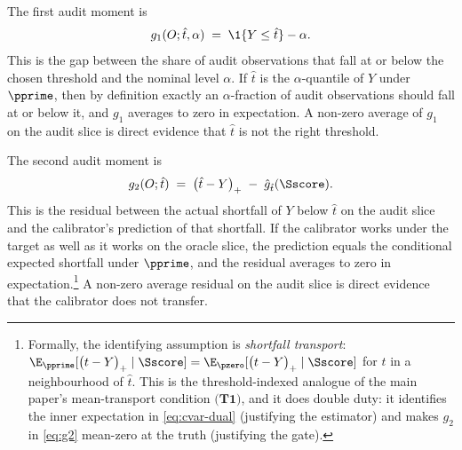 \documentclass[11pt]{article}
\newcommand{\stoploss}[2]{\bigl(#1 - #2\bigr)_{+}}
\begin{document}
The first audit moment is
\begin{equation}\label{eq:g1}
g_1(O; \hat t, \alpha) \;=\; \1\{Y \le \hat t\} - \alpha.
\end{equation}
This is the gap between the share of audit observations that fall at or below the chosen threshold and the nominal level $\alpha$. If $\hat t$ is the $\alpha$-quantile of $Y$ under $\pprime$, then by definition exactly an $\alpha$-fraction of audit observations should fall at or below it, and $g_1$ averages to zero in expectation. A non-zero average of $g_1$ on the audit slice is direct evidence that $\hat t$ is not the right threshold.

The second audit moment is
\begin{equation}\label{eq:g2}
g_2(O; \hat t) \;=\; \stoploss{\hat t}{Y} \;-\; \hat g_{\hat t}(\Sscore).
\end{equation}
This is the residual between the actual shortfall of $Y$ below $\hat t$ on the audit slice and the calibrator's prediction of that shortfall. If the calibrator works under the target as well as it works on the oracle slice, the prediction equals the conditional expected shortfall under $\pprime$, and the residual averages to zero in expectation.\footnote{Formally, the identifying assumption is \emph{shortfall transport}: $\E_{\pprime}[\stoploss{t}{Y}\mid \Sscore] = \E_{\pzero}[\stoploss{t}{Y}\mid \Sscore]$ for $t$ in a neighbourhood of $\hat t$. This is the threshold-indexed analogue of the main paper's mean-transport condition $\textbf{(T1)}$, and it does double duty: it identifies the inner expectation in \cref{eq:cvar-dual} (justifying the estimator) and makes $g_2$ in \cref{eq:g2} mean-zero at the truth (justifying the gate).} A non-zero average residual on the audit slice is direct evidence that the calibrator does not transfer.
\end{document}
